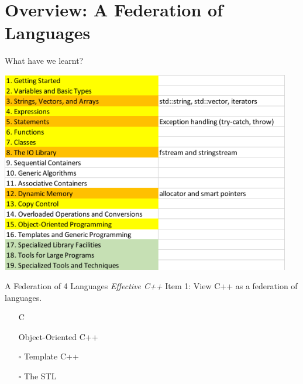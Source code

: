\section{Overview: A Federation of Languages}

\begin{frame}{What have we learnt?}
    \begin{center}
        \includegraphics[width=0.95\textwidth]{img/contents.png}
    \end{center}
\end{frame}

\begin{frame}{A Federation of 4 Languages}
    \textit{Effective C++} Item 1: View C++ as a federation of languages.
    \begin{itemize}
        \item[\done] C
        \item[\done] Object-Oriented C++
        \item[\(\square\)] Template C++
        \item[\(\square\)] The STL
    \end{itemize}
\end{frame}